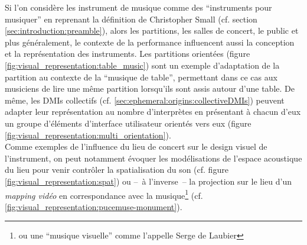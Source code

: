 \noindent Si l'on considère les instrument de musique comme des ``instruments pour musiquer'' en reprenant la définition de Christopher Small (cf. section \ref{sec:introduction:preamble}), alors les partitions, les salles de concert, le public et plus généralement, le contexte de la performance influencent aussi la conception et la représentation des instruments. Les partitions orientées (figure \ref{fig:visual_representation:table_music}) sont un exemple d'adaptation de la partition au contexte de la ``musique de table'', permettant dans ce cas aux musiciens de lire une même partition lorsqu'ils sont assis autour d'une table. De même, les \glspl{DMI} collectifs (cf. \ref{sec:ephemeral:origins:collectiveDMIs}) peuvent adapter leur représentation au nombre d'interprètes en présentant à chacun d'eux un groupe d'éléments d'interface utilisateur orientés vers eux (figure \ref{fig:visual_representation:multi_orientation}).\\
\indent Comme exemples de l'influence du lieu de concert sur le design visuel de l'instrument, on peut notamment évoquer les modélisations de l'espace acoustique du lieu pour venir contrôler la spatialisation du son (cf. figure \ref{fig:visual_representation:spat}) ou --~à l'inverse~-- la projection sur le lieu d'un \textit{mapping vidéo} en correspondance avec la musique\footnote{ou une ``musique visuelle'' comme l'appelle Serge de Laubier} (cf. \ref{fig:visual_representation:pucemuse-monument}).

